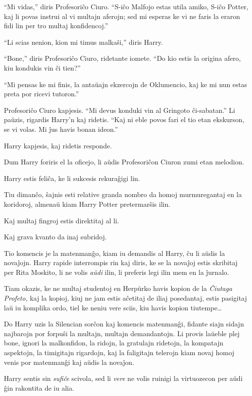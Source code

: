 ``Mi vidas,'' diris Profesoriĉo Ciuro. ``S-iĉo Malfojo estas utila amiko, S-iĉo
Potter, kaj li povas instrui al vi multajn aferojn; sed mi esperas ke vi ne
faris la eraron fidi lin per tro multaj konfidencoj.''

``Li scias nenion, kion mi timus malkaŝi,'' diris Harry.

``Bone,'' diris Profesoriĉo Ciuro, ridetante iomete. ``Do kio estis la origina
afero, kiu kondukis vin ĉi tien?''

``Mi pensas ke mi finis, la antaŭajn ekzercojn de Oklumencio, kaj ke mi nun
estas preta por ricevi tutoron.''

Profesoriĉo Ciuro kapjesis. ``Mi devus konduki vin al Gringoto ĉi-sabatan.'' Li
paŭzis, rigardis Harry'n kaj ridetis. ``Kaj ni eble povos fari el tio etan
ekskurson, se vi volas. Mi ĵus havis bonan ideon.''

Harry kapjesis, kaj ridetis responde.

Dum Harry foriris el la oficejo, li aŭdis Profesoriĉon Ciuron zumi etan
melodion.

Harry estis feliĉa, ke li sukcesis rekuraĝigi lin.

\later

Tiu dimanĉo, ŝajnis esti relative granda nombro da homoj murmuregantaj en la
koridoroj, almenaŭ kiam Harry Potter pretermarŝis ilin.

Kaj multaj fingroj estis direktitaj al li.

Kaj grava kvanto da inaj subridoj.

Tio komencis je la matenmanĝo, kiam iu demandis al Harry, ĉu li aŭdis la
novaĵojn. Harry rapide interrompis rin kaj diris, ke se la novaĵoj estis
skribitaj per Rita Moskito, li ne volis \emph{aŭdi} ilin, li preferis legi ilin
mem en la ĵurnalo.

Tiam okazis, ke ne multaj studentoj en Herpŭrko havis kopion de la \emph{Ĉiutaga
Profeto,} kaj la kopioj, kiuj ne jam estis aĉetitaj de iliaj posedantaj, estis
pasigitaj laŭ iu komplika ordo, tiel ke neniu vere sciis, kiu havis kopion
tiutempe\ldots{}

Do Harry uzis la Silencian sorĉon kaj komencis matenmanĝi, fidante siajn sidajn
najbarojn por forpuŝi la multajn, multajn demandantojn. Li provis laŭeble plej
bone, ignori la malkonfidon, la ridojn, la gratulajn ridetojn, la kompatajn
aspektojn, la timigitajn rigardojn, kaj la faligitajn telerojn kiam novaj homoj
venis por matenmanĝi kaj aŭdis la novaĵon.

Harry sentis sin \emph{sufiĉe} scivola, sed li \emph{vere} ne volis ruinigi la
virtuozecon per aŭdi ĝin rakontita de iu alia.

